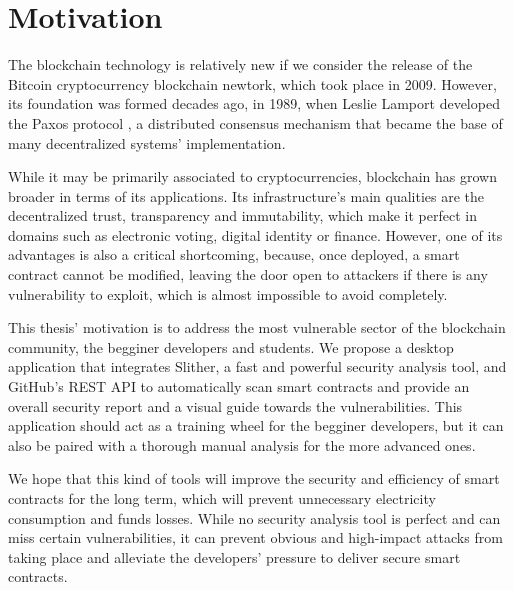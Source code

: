 \chapter*{Motivation} 

The blockchain technology \cite{blockchain} is relatively new if we consider the release of the Bitcoin cryptocurrency blockchain newtork, which took place in 2009. However, its foundation was formed decades ago, in 1989, when Leslie Lamport developed the Paxos protocol \cite{paxos}, a distributed consensus mechanism that became the base of many decentralized systems' implementation.

While it may be primarily associated to cryptocurrencies, blockchain has grown broader in terms of its applications. Its infrastructure's main qualities are the decentralized trust, transparency and immutability, which make it perfect in domains such as electronic voting, digital identity or finance. However, one of its advantages is also a critical shortcoming, because, once deployed, a smart contract cannot be modified, leaving the door open to attackers if there is any vulnerability to exploit, which is almost impossible to avoid completely.

This thesis' motivation is to address the most vulnerable sector of the blockchain community, the begginer developers and students. We propose a desktop application that integrates Slither, a fast and powerful security analysis tool, and GitHub's REST API to automatically scan smart contracts and provide an overall security report and a visual guide towards the vulnerabilities. This application should act as a training wheel for the begginer developers, but it can also be paired with a thorough manual analysis for the more advanced ones.

We hope that this kind of tools will improve the security and efficiency of smart contracts for the long term, which will prevent unnecessary electricity consumption and funds losses. While no security analysis tool is perfect and can miss certain vulnerabilities, it can prevent obvious and high-impact attacks from taking place and alleviate the developers' pressure to deliver secure smart contracts.